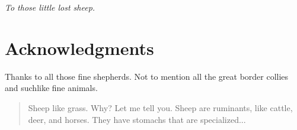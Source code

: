 \documentclass{umthesis}          %
\begin{document}
\begin{dedication}              %
  \begin{center}
    \emph{To those little lost sheep.}
  \end{center}
\end{dedication}

%
%
%

\chapter{Acknowledgments}             %
  Thanks to all those fine shepherds. Not to mention all the great
  border collies and suchlike fine animals.

\begin{abstract}                %
  Sheep like grass.  Why?  Let me tell you.  Sheep are ruminants, like
  cattle, deer, and horses.  They have stomachs that are specialized...
\end{abstract}
\end{document}
